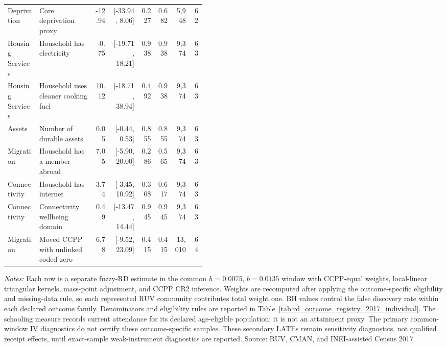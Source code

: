 \begin{longtable}{p{0.16\linewidth}p{0.29\linewidth}rrrrrr}
Deprivation & Core deprivation proxy & -12.94 & [-33.94, 8.06] & 0.227 & 0.682 & 5,948 & 62 \\
Housing Services & Household has electricity & -0.75 & [-19.71, 18.21] & 0.938 & 0.938 & 9,374 & 63 \\
Housing Services & Household uses cleaner cooking fuel & 10.12 & [-18.71, 38.94] & 0.492 & 0.938 & 9,374 & 63 \\
Assets & Number of durable assets & 0.05 & [-0.44, 0.53] & 0.855 & 0.855 & 9,374 & 63 \\
Migration & Household has a member abroad & 7.05 & [-5.90, 20.00] & 0.286 & 0.565 & 9,374 & 63 \\
Connectivity & Household has internet & 3.74 & [-3.45, 10.92] & 0.308 & 0.617 & 9,374 & 63 \\
Connectivity & Connectivity wellbeing domain & 0.49 & [-13.47, 14.44] & 0.945 & 0.945 & 9,374 & 63 \\
Migration & Moved CCPP with unlinked coded zero & 6.78 & [-9.52, 23.09] & 0.415 & 0.415 & 13,010 & 64 \\
\bottomrule
\end{longtable}
\begin{minipage}{0.98\linewidth}\footnotesize\textit{Notes:} Each row is a separate fuzzy-RD estimate in the common \(h=0.0075\), \(b=0.0135\) window with CCPP-equal weights, local-linear triangular kernels, mass-point adjustment, and CCPP CR2 inference. Weights are recomputed after applying the outcome-specific eligibility and missing-data rule, so each represented RUV community contributes total weight one. BH values control the false discovery rate within each declared outcome family. Denominators and eligibility rules are reported in Table~\ref{tab:rd_outcome_registry_2017_individual}. The schooling measure records current attendance for its declared age-eligible population; it is not an attainment proxy. The primary common-window IV diagnostics do not certify these outcome-specific samples. These secondary LATEs remain sensitivity diagnostics, not qualified receipt effects, until exact-sample weak-instrument diagnostics are reported. Source: RUV, CMAN, and INEI-assisted Census 2017.\end{minipage}
\endgroup
